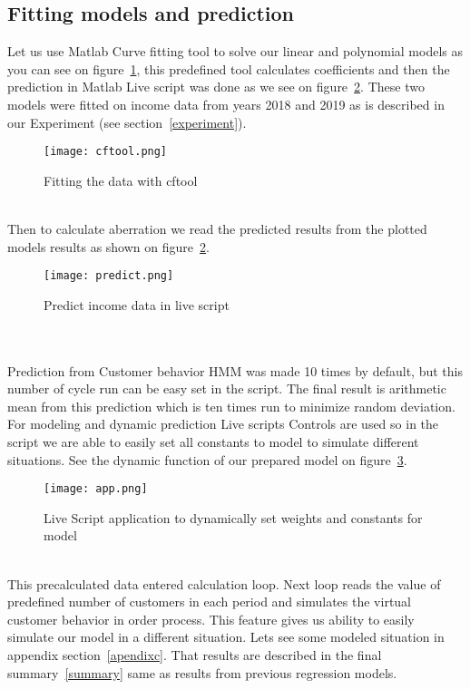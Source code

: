 \subsection{Fitting models and prediction} \label{fitting}
Let us use Matlab Curve fitting tool to solve our linear and polynomial models as you can see on figure~\ref{cftool},
this predefined tool calculates coefficients and then the prediction in Matlab Live script was done as we see on figure~\ref{predict}.
These two models were fitted on income data from years 2018 and 2019 as is described in our Experiment (see section~\ref{experiment}).
\begin{figure}[h!]
    \begin{center}
        \texttt{[image: cftool.png]}
    \end{center}
    \caption{Fitting the data with cftool~\cite{luarn}}
    \label{cftool}
\end{figure}\\
Then to calculate aberration we read the predicted results from the plotted models results as shown on figure~\ref{predict}.
\begin{figure}[h!]
    \begin{center}
        \texttt{[image: predict.png]}
    \end{center}
    \caption{Predict income data in live script~\cite{luarn}}
    \label{predict}
\end{figure}\\
\\
Prediction from Customer behavior HMM was made 10 times by default, but this number of cycle run can be easy set in the script.
The final result is arithmetic mean from this prediction which is ten times run to minimize random deviation.
For modeling and dynamic prediction Live scripts Controls are used so in the script we are able to easily set all
constants to model to simulate different situations.
See the dynamic function of our prepared model on figure~\ref{app}.
\begin{figure}[h!]
    \begin{center}
        \texttt{[image: app.png]}
    \end{center}
    \caption{Live Script application to dynamically set weights and constants for model}
    \label{app}
\end{figure}\\
This precalculated data entered calculation loop.
Next loop reads the value of predefined number of customers in each period and simulates the virtual customer behavior in order process.
This feature gives us ability to easily simulate our model in a different situation.
Lets see some modeled situation in appendix section~\ref{apendixc}.
That results are described in the final summary~\ref{summary} same as results from previous regression models.
